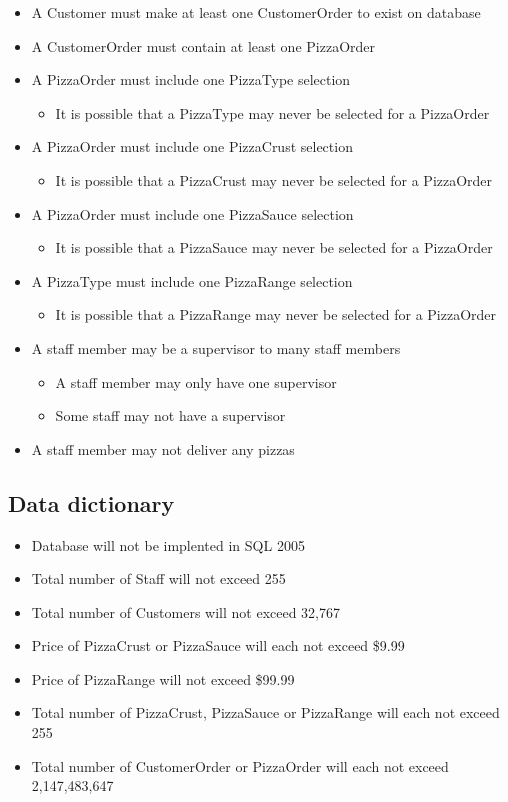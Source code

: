 \begin{itemize}
\item A Customer must make at least one CustomerOrder to exist on database
\item A CustomerOrder must contain at least one PizzaOrder
\item A PizzaOrder must include one PizzaType selection
	\begin{itemize}
	\item It is possible that a PizzaType may never be selected for a PizzaOrder
	\end{itemize}
\item A PizzaOrder must include one PizzaCrust selection
	\begin{itemize}
	\item It is possible that a PizzaCrust may never be selected for a PizzaOrder
	\end{itemize}
\item A PizzaOrder must include one PizzaSauce selection
	\begin{itemize}
	\item It is possible that a PizzaSauce may never be selected for a PizzaOrder
	\end{itemize}
\item A PizzaType must include one PizzaRange selection
	\begin{itemize}
	\item It is possible that a PizzaRange may never be selected for a PizzaOrder
	\end{itemize}
\item A staff member may be a supervisor to many staff members
	\begin{itemize}
	\item A staff member may only have one supervisor
	\item Some staff may not have a supervisor
	\end{itemize}
\item A staff member may not deliver any pizzas
\end{itemize}

\subsection{Data dictionary}

\begin{itemize}
\item Database will not be implented in SQL 2005
\item Total number of Staff will not exceed 255
\item Total number of Customers will not exceed 32,767
\item Price of PizzaCrust or PizzaSauce will each not exceed \$9.99
\item Price of PizzaRange will not exceed \$99.99
\item Total number of PizzaCrust, PizzaSauce or PizzaRange will each not exceed 255
\item Total number of CustomerOrder or PizzaOrder will each not exceed 2,147,483,647
\end{itemize}